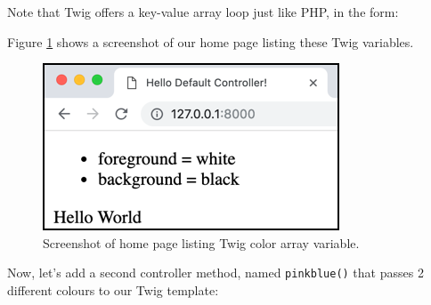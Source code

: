 \documentclass[a4paperpaper,openright]{book}
\newenvironment{Shaded}{}{}
\newcommand{\AnnotationTok}[1]{\textcolor[rgb]{0.38,0.63,0.69}{\textbf{\textit{#1}}}}
\newcommand{\CommentTok}[1]{\textcolor[rgb]{0.38,0.63,0.69}{\textit{#1}}}
\newcommand{\KeywordTok}[1]{\textcolor[rgb]{0.00,0.44,0.13}{\textbf{#1}}}
\newcommand{\NormalTok}[1]{#1}
\newcommand{\OtherTok}[1]{\textcolor[rgb]{0.00,0.44,0.13}{#1}}
\newcommand{\StringTok}[1]{\textcolor[rgb]{0.25,0.44,0.63}{#1}}
\begin{document}
Note that Twig offers a key-value array loop just like PHP, in the form:

\begin{Shaded}
\begin{Highlighting}[]
\NormalTok{    \{%
\end{Highlighting}
\end{Shaded}

Figure \ref{twig_blackwhite} shows a screenshot of our home page listing
these Twig variables.

\begin{figure}
\centering
\includegraphics{./tex2pdf.-65f13e14688ab55b/685d4f89bf346bb223565ae18fae3a64be9f00e9.png}
\caption{Screenshot of home page listing Twig color array variable.
\label{twig_blackwhite}}
\end{figure}

Now, let's add a second controller method, named \texttt{pinkblue()}
that passes 2 different colours to our Twig template:

\begin{Shaded}
\end{Shaded}
\end{document}
